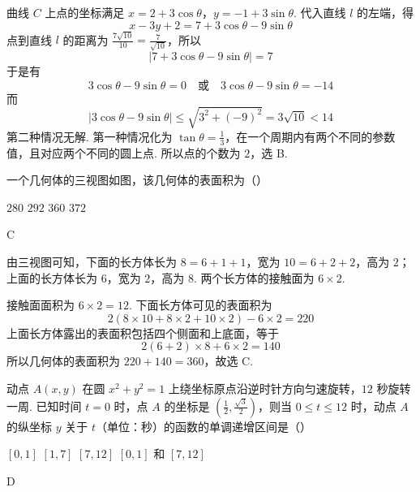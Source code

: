 \begin{solution}
曲线 \(C\) 上点的坐标满足
\(x=2+3\cos\theta\)，\(y=-1+3\sin\theta\).
代入直线 \(l\) 的左端，得
\[
x-3y+2=7+3\cos\theta-9\sin\theta
\]
点到直线 \(l\) 的距离为 \(\frac{7\sqrt{10}}{10}=\frac{7}{\sqrt{10}}\)，所以
\[
\left|7+3\cos\theta-9\sin\theta\right|=7
\]
于是有
\[
3\cos\theta-9\sin\theta=0
\quad\text{或}\quad
3\cos\theta-9\sin\theta=-14
\]
而
\[
\left|3\cos\theta-9\sin\theta\right|\leqslant\sqrt{3^2+(-9)^2}=3\sqrt{10}<14
\]
第二种情况无解. 第一种情况化为 \(\tan\theta=\frac{1}{3}\)，在一个周期内有两个不同的参数值，且对应两个不同的圆上点. 所以点的个数为 \(2\)，选 B.
\end{solution}

\begin{problem}
一个几何体的三视图如图，该几何体的表面积为（\quad）


\choices
    {\(280\)}
    {\(292\)}
    {\(360\)}
    {\(372\)}
\end{problem}

\begin{answer}
C
\end{answer}

\begin{solution}
由三视图可知，下面的长方体长为 \(8=6+1+1\)，宽为 \(10=6+2+2\)，高为 \(2\)；上面的长方体长为 \(6\)，宽为 \(2\)，高为 \(8\). 两个长方体的接触面为 \(6\times2\).

接触面面积为 \(6\times2=12\). 下面长方体可见的表面积为
\[
2(8\times10+8\times2+10\times2)-6\times2=220
\]
上面长方体露出的表面积包括四个侧面和上底面，等于
\[
2(6+2)\times8+6\times2=140
\]
所以几何体的表面积为 \(220+140=360\)，故选 C.
\end{solution}

\begin{problem}
动点 \(A(x, y)\) 在圆 \(x^2 + y^2 = 1\) 上绕坐标原点沿逆时针方向匀速旋转，\(12\text{ 秒}\)旋转一周. 已知时间 \(t = 0\) 时，点 \(A\) 的坐标是 \(\left(\frac{1}{2}, \frac{\sqrt{3}}{2}\right)\)，则当 \(0 \leqslant t \leqslant 12\) 时，动点 \(A\) 的纵坐标 \(y\) 关于 \(t\)（单位：秒）的函数的单调递增区间是（\quad）

\choices
    {\([0,1]\)}
    {\([1,7]\)}
    {\([7,12]\)}
    {\([0,1]\) 和 \([7,12]\)}
\end{problem}

\begin{answer}
D
\end{answer}

